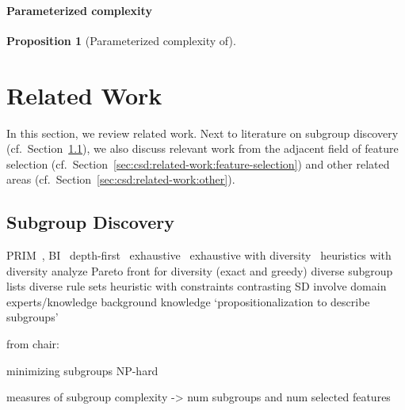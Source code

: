 \documentclass{article}
\newtheorem{proposition}{Proposition}
\theoremstyle{definition}
\begin{document}
\paragraph{Parameterized complexity}

\begin{proposition}[Parameterized complexity of]
	\label{prop:csd:complexity-alternatives-xp}
\end{proposition}

\section{Related Work}
\label{sec:csd:related-work}

In this section, we review related work.
Next to literature on subgroup discovery (cf.~Section~\ref{sec:csd:related-work:subgroup-discovery}), we also discuss relevant work from the adjacent field of feature selection (cf.~Section~\ref{sec:csd:related-work:feature-selection}) and other related areas (cf.~Section~\ref{sec:csd:related-work:other}).

\subsection{Subgroup Discovery}
\label{sec:csd:related-work:subgroup-discovery}

PRIM~\cite{friedman1999bump}, BI~\cite{mampaey2012efficient}
depth-first~\cite{millot2020optimal}
exhaustive~\cite{atzmueller2006sd, atzmueller2009fast, grosskreutz2009subgroup, lemmerich2016fast}
exhaustive with diversity~\cite{bosc2018anytime, lemmerich2010fast}
heuristics with diversity \cite{leeuwen2012diverse, lucas2018ssdp+, proencca2022robust}
analyze Pareto front for diversity (exact and greedy) \cite{leeuwen2013discovering}
diverse subgroup lists \cite{lopez2023discovering, lopez2023novel}
diverse rule sets \cite{zhang2020diverse}
heuristic with constraints \cite{lavravc2006relevancy}
contrasting SD \cite{langohr2013contrasting}
involve domain experts/knowledge \cite{dzyuba2013interactive, gamberger2002expert, lemmerich2011local}
background knowledge \cite{atzmueller2005exploiting, atzmueller2006methodological}
`propositionalization to describe subgroups' \cite{zelezny2006propositionalization}

from chair: \cite{arzamasov2021reds} \cite{arzamasov2022pedagogical} \cite{vollmer2019informative}

minimizing subgroups NP-hard~\cite{boley2009non}

measures of subgroup complexity \cite{helal2016subgroup, herrera2011overview, ventura2018subgroup} -> num subgroups and num selected features
\end{document}
